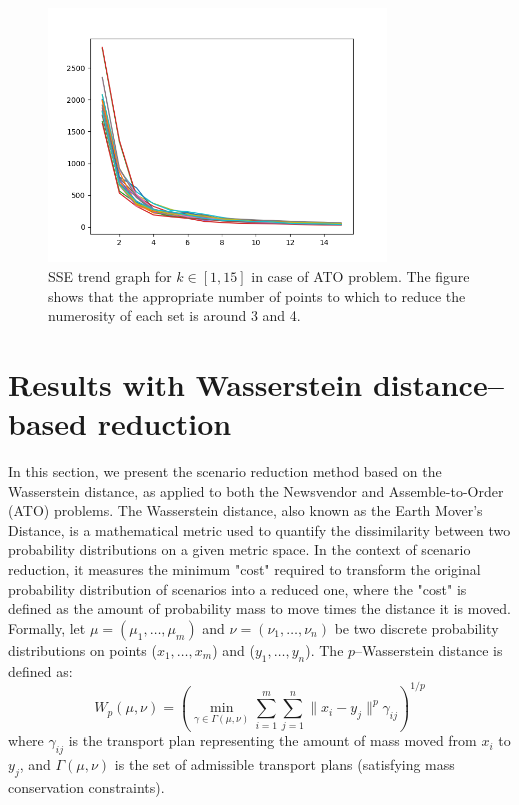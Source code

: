 \documentclass[a4paper,12pt]{article}
\begin{document}
	
	\begin{figure}[H]
		\centering
		\includegraphics[width=0.8\textwidth]{../immagini/sseATO.png}
		\caption{SSE trend graph for $k \in [1,15]$ in case of ATO problem. The figure shows that the appropriate number of points to which to reduce the numerosity of each set is around 3 and 4.}
		\label{fig:sse-ato}
	\end{figure}
	
	\newpage
	\section{Results with Wasserstein distance--based reduction}
	
	In this section, we present the scenario reduction method based on the Wasserstein distance, as applied to both the Newsvendor and Assemble-to-Order (ATO) problems. The Wasserstein distance, also known as the Earth Mover's Distance, is a mathematical metric used to quantify the dissimilarity between two probability distributions on a given metric space. In the context of scenario reduction, it measures the minimum "cost" required to transform the original probability distribution of scenarios into a reduced one, where the "cost" is defined as the amount of probability mass to move times the distance it is moved.\\	
	
	\noindent Formally, let $\mu = (\mu_1, \ldots, \mu_m)$ and $\nu = (\nu_1, \ldots, \nu_n)$ be two discrete probability distributions on points ($x_1, \ldots, x_m$) and ($y_1, \ldots, y_n$). The $p$--Wasserstein distance is defined as:
	\[
	W_p(\mu, \nu) = \left( \min_{\gamma \in \Gamma(\mu, \nu)} \sum_{i=1}^m \sum_{j=1}^n \|x_i - y_j\|^p \gamma_{ij} \right)^{1/p}
	\]
	where $\gamma_{ij}$ is the transport plan representing the amount of mass moved from $x_i$ to $y_j$, and $\Gamma(\mu, \nu)$ is the set of admissible transport plans (satisfying mass conservation constraints). \\
	
\end{document}
